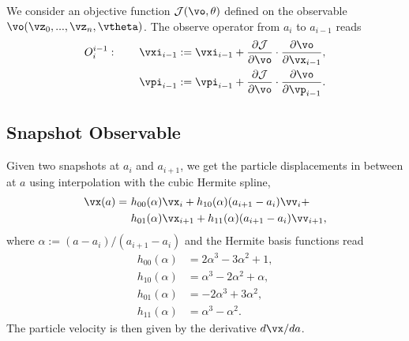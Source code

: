 \documentclass[usenatbib]{mnras}
\renewcommand{\d}{d}
\newcommand{\p}{\partial}
\newcommand{\cJ}{\mathcal{J}}
\newcommand{\half}{\nicefrac12}
\begin{document}
We consider an objective function $\cJ(\vo, \theta)$ defined on the observable
$\vo(\vz_0,...,\vz_n,\vtheta)$.
The observe operator from $a_i$ to $a_{i-1}$ reads
\begin{align}
  O_i^{i-1}: \qquad \vxi_{i-1} :\:\!\!\!&= \vxi_{i-1}
  + \frac{\p\cJ}{\p\vo} \cdot \frac{\p\vo}{\p\vx_{i-1}}, \nonumber\\
                    \vpi_{i-1} :\:\!\!\!&= \vpi_{i-1}
  + \frac{\p\cJ}{\p\vo} \cdot \frac{\p\vo}{\p\vp_{i-1}}.
\end{align}



\subsection{Snapshot Observable}
\label{sec:snapobs}

Given two snapshots at $a_i$ and $a_{i+1}$, we get the particle displacements
in between at $a$ using interpolation with the cubic Hermite spline,
\begin{align}
  \vx(a) =\ &h_{00}(\alpha)\vx_i + h_{10}(\alpha)(a_{i+1} - a_i)\vv_i + \nonumber\\
           &h_{01}(\alpha)\vx_{i+1} + h_{11}(\alpha)(a_{i+1} - a_i)\vv_{i+1},
\end{align}
where $\alpha := (a - a_i)/(a_{i+1} - a_i)$ and the Hermite basis functions read
\begin{align}
  h_{00}(\alpha) &= 2\alpha^3 - 3\alpha^2 + 1, \nonumber\\
  h_{10}(\alpha) &= \alpha^3 - 2\alpha^2 + \alpha, \nonumber\\
  h_{01}(\alpha) &= -2\alpha^3 + 3\alpha^2, \nonumber\\
  h_{11}(\alpha) &= \alpha^3 - \alpha^2.
\end{align}
The particle velocity is then given by the derivative $\d\vx / \d a$.
\end{document}
